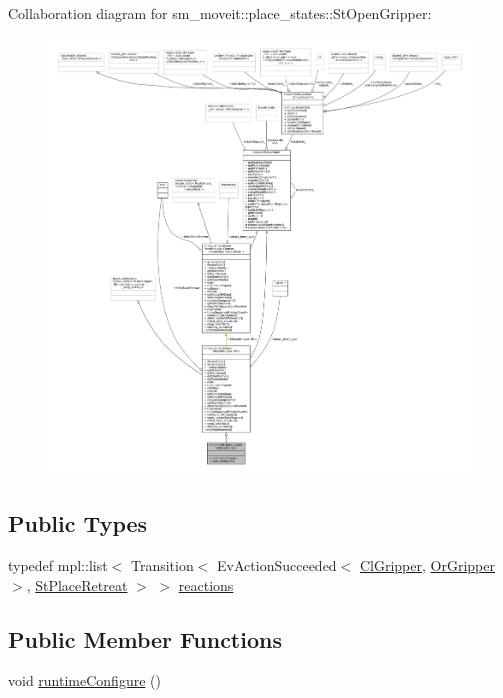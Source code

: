 Collaboration diagram for sm\+\_\+moveit\+:\+:place\+\_\+states\+:\+:St\+Open\+Gripper\+:
\nopagebreak
\begin{figure}[H]
\begin{center}
\leavevmode
\includegraphics[width=350pt]{structsm__moveit_1_1place__states_1_1StOpenGripper__coll__graph}
\end{center}
\end{figure}
\subsection*{Public Types}
\begin{DoxyCompactItemize}
\item 
typedef mpl\+::list$<$ Transition$<$ Ev\+Action\+Succeeded$<$ \hyperlink{classsm__moveit_1_1cl__gripper_1_1ClGripper}{Cl\+Gripper}, \hyperlink{classsm__moveit_1_1OrGripper}{Or\+Gripper} $>$, \hyperlink{structsm__moveit_1_1place__states_1_1StPlaceRetreat}{St\+Place\+Retreat} $>$ $>$ \hyperlink{structsm__moveit_1_1place__states_1_1StOpenGripper_ac79e4ee839e3fa0aaf17e97a146034a9}{reactions}
\end{DoxyCompactItemize}
\subsection*{Public Member Functions}
\begin{DoxyCompactItemize}
\item 
void \hyperlink{structsm__moveit_1_1place__states_1_1StOpenGripper_a49b45992f2ff9a5f1435b14eab1f2621}{runtime\+Configure} ()
\end{DoxyCompactItemize}

